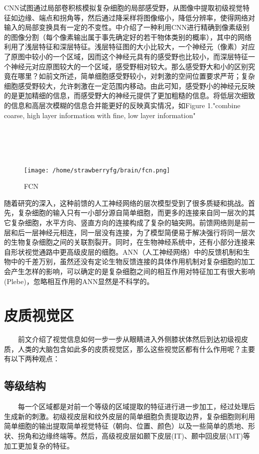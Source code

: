 \documentclass{article}
\begin{document}
\begin{spacing}{1.0}
	CNN试图通过局部卷积核模拟复杂细胞的局部感受野，从图像中提取初级视觉特征如边缘、端点和拐角等，然后通过降采样将图像缩小，降低分辨率，使得网络对输入的局部变换具有一定的不变性。\cite{fcn}中介绍了一种利用CNN进行精确到像素级别的图像分割（每个像素输出属于事先确定好的若干物体类别的概率），其中的网络利用了浅层特征和深层特征。浅层特征图的大小比较大，一个神经元（像素）对应了原图中较小的一个区域，因而这个神经元具有的感受野也比较小，而深层特征一个神经元对应原图较大的一个区域，感受野相对较大。那么感受野大和小的区别究竟在哪里？如前文所述，简单细胞感受野较小，对刺激的空间位置要求严苛；复杂细胞感受野较大，允许刺激在一定范围内移动。由此可知，感受野小的神经元反映的是更加精细的信息，而感受野大的神经元提供了更加粗糙的信息。将低层次细致的信息和高层次模糊的信息合并能更好的反映真实情况，如Figure 1."combine coarse, high layer information with fine, low layer information"\\ \\ \\ \\ \\
\begin{figure}[htbp]
\centering
\texttt{[image: /home/strawberryfg/brain/fcn.png]}
\caption{FCN}
\end{figure}\par 
	随着研究的深入，这种前馈的人工神经网络的层次模型受到了很多质疑和挑战。首先，复杂细胞的输入只有一小部分源自简单细胞，而更多的连接来自同一层次的其它复杂细胞，水平方向、竖直方向的连接构成了复杂的轴突网\cite{jsll}。前馈网络则是前一层和后一层神经元相连，同一层没有连接，为了模型简便易于解决强行将同一层次的生物复杂细胞之间的关联割裂开。同时，在生物神经系统中，还有小部分连接来自形状视觉通路中更高级皮层的细胞。ANN（人工神经网络）中的反馈机制和生物中的千差万别，虽然还没有定论生物反馈连接的具体作用机制对复杂细胞的加工会产生怎样的影响，可以确定的是复杂细胞之间的相互作用对特征加工有很大影响(Plebe)，忽略相互作用的ANN显然是不科学的。
\section{皮质视觉区}
\ \ \ \ 前文介绍了视觉信息如何一步一步从眼睛进入外侧膝状体然后到达初级视皮质，人类的大脑包含如此多的皮质视觉区，那么这些视觉区都有什么作用呢？主要有以下两种观点：
\subsection{等级结构}
\ \ \ \ 每一个区域都是对前一个等级的区域提取的特征进行进一步加工，经过处理后生成新的刺激。初级视皮层和纹外皮层的简单细胞负责提取边界，复杂细胞则利用简单细胞的输出提取简单视觉特征（朝向、位置、颜色）以及一些简单的质地、形状、拐角和边缘终端等。然后，高级视皮层如颞下皮层(IT)、颞中回皮层(MT)等加工更加复杂的特征。

\end{spacing}
\end{document}
